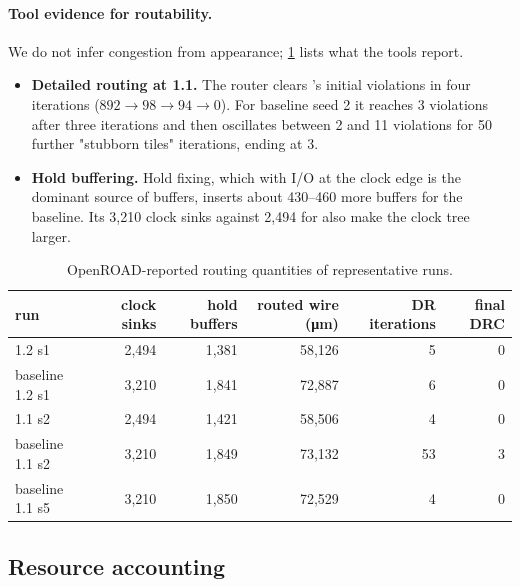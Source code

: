 \paragraph{Tool evidence for routability.} We do not infer congestion from appearance; \cref{tab:route-evidence} lists what the tools report.
\begin{itemize}
  \item \textbf{Detailed routing at 1.1\ns.} The router clears \PAMS{}'s initial violations in four iterations ($892 \to 98 \to 94 \to 0$). For baseline seed 2 it reaches 3 violations after three iterations and then oscillates between 2 and 11 violations for 50 further "stubborn tiles" iterations, ending at 3.
  \item \textbf{Hold buffering.} Hold fixing, which with I/O at the clock edge is the dominant source of buffers, inserts about 430--460 more buffers for the baseline. Its 3,210 clock sinks against 2,494 for \PAMS{} also make the clock tree larger.
\end{itemize}

\begin{table}[h]\centering\small
\caption{OpenROAD-reported routing quantities of representative runs.}\label{tab:route-evidence}
\begin{tabular}{@{}lrrrrr@{}}
\toprule
run & clock sinks & hold buffers & routed wire (\si{\micro\meter}) & DR iterations & final DRC \\
\midrule
\PAMS{} 1.2\ns{} s1 & 2,494 & 1,381 & 58,126 & 5 & 0 \\
baseline 1.2\ns{} s1 & 3,210 & 1,841 & 72,887 & 6 & 0 \\
\PAMS{} 1.1\ns{} s2 & 2,494 & 1,421 & 58,506 & 4 & 0 \\
baseline 1.1\ns{} s2 & 3,210 & 1,849 & 73,132 & 53 & 3 \\
baseline 1.1\ns{} s5 & 3,210 & 1,850 & 72,529 & 4 & 0 \\
\bottomrule
\end{tabular}
\end{table}

\subsection{Resource accounting}\label{app:resources}
